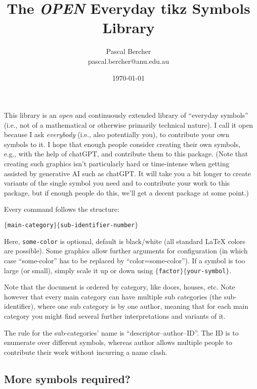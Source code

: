 \documentclass{article}
\begin{document}
\title{The \emph{OPEN} Everyday tikz Symbols Library}
\author{Pascal Bercher\\pascal.bercher@anu.edu.au}
\date{\today}

\maketitle

This library is an \emph{open} and continuously extended library of ``everyday symbols'' (i.e., not of a mathematical or otherwise primarily technical nature). I call it open because I ask \emph{everybody} (i.e., also potentially you), to contribute your own symbols to it. I hope that enough people consider creating their own symbols, e.g., with the help of chatGPT, and contribute them to this package. (Note that creating such graphics isn't particularly hard or time-intense when getting assisted by generative AI such as chatGPT. It will take you a bit longer to create variants of the single symbol you need and to contribute your work to this package, but if enough people do this, we'll get a decent package at some point.)

\medskip
Every command follows the structure:
\begin{center}
  \texttt{\string{}$\{$main-category$\}\{$sub-identifier-number$\}$}
\end{center}
Here, \texttt{some-color} is optional, default is black/white (all standard \LaTeX{} colors are possible). Some graphics allow further arguments for configuration (in which case ``some-color'' has to be replaced by ``color=some-color''). If a symbol is too large (or small), simply scale it up or down using
\texttt{\string\scalebox$\{$factor$\}\{$your-symbol$\}$}.

\medskip
Note that the document is ordered by category, like doors, houses, etc. Note however that every main category can have multiple sub categories (the sub-identifier), where one sub category is by one author, meaning that for each main category you might find several further interpretations and variants of it. 

\medskip
The rule for the sub-categories' name is ``descriptor--author--ID''. The ID is to enumerate over different symbols, whereas author allows multiple people to contribute their work without incurring a name clash.

\subsection*{More symbols required?}
\end{document}
